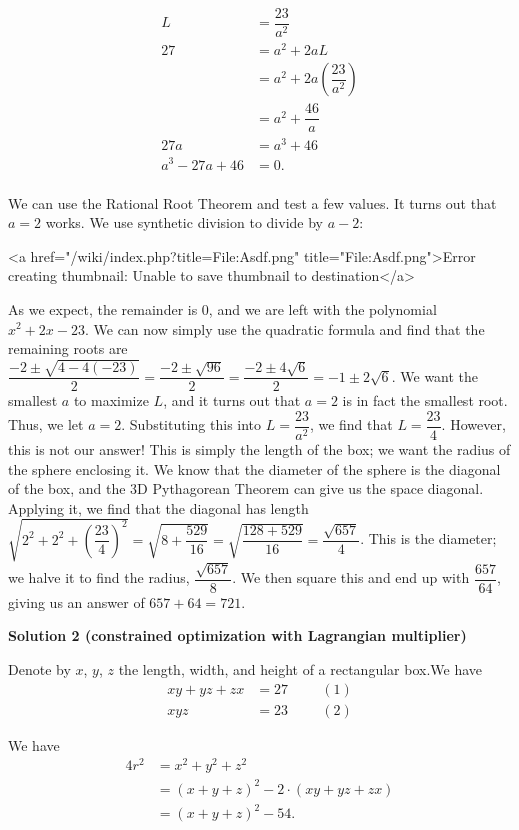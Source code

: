 \begin{enumerate}
 \begin{align*}L&=\dfrac{23}{a^2} \\27&=a^2+2aL \\&=a^2+2a\left(\dfrac{23}{a^2}\right) \\&=a^2+\dfrac{46}a \\27a&=a^3+46 \\a^3-27a+46&=0. \\\end{align*}


 We can use the Rational Root Theorem and test a few values. It turns out that $a=2$ works. We use synthetic division to divide by $a-2$: 

 <a href="/wiki/index.php?title=File:Asdf.png" title="File:Asdf.png">Error creating thumbnail: Unable to save thumbnail to destination</a>

 As we expect, the remainder is $0$, and we are left with the polynomial $x^2+2x-23$. We can now simply use the quadratic formula and find that the remaining roots are $\dfrac{-2\pm\sqrt{4-4(-23)}}2=\dfrac{-2\pm\sqrt{96}}2=\dfrac{-2\pm4\sqrt{6}}2=-1\pm2\sqrt6$. We want the smallest $a$ to maximize $L$, and it turns out that $a=2$ is in fact the smallest root. Thus, we let $a=2$. Substituting this into $L=\dfrac{23}{a^2}$, we find that $L=\dfrac{23}4$. However, this is not our answer! This is simply the length of the box; we want the radius of the sphere enclosing it. We know that the diameter of the sphere is the diagonal of the box, and the 3D Pythagorean Theorem can give us the space diagonal. Applying it, we find that the diagonal has length $\sqrt{2^2+2^2+\left(\dfrac{23}4\right)^2}=\sqrt{8+\dfrac{529}{16}}=\sqrt{\dfrac{128+529}{16}}=\dfrac{\sqrt{657}}4$. This is the diameter; we halve it to find the radius, $\dfrac{\sqrt{657}}8$. We then square this and end up with $\dfrac{657}{64}$, giving us an answer of $657+64=\boxed{721}$. 

 



\textbf{Solution 2 (constrained optimization with Lagrangian multiplier)}

Denote by $x$, $y$, $z$ the length, width, and height of a rectangular box.We have\begin{align*}xy + yz + zx & = 27  \hspace{1cm} (1) \\xyz & = 23 \hspace{1cm} (2)\end{align*}


 We have\begin{align*}4 r^2 & = x^2 + y^2 + z^2 \\& = \left( x + y + z \right)^2 - 2 \cdot \left( xy + yz + zx \right) \\& = \left( x + y + z \right)^2 - 54 .\end{align*}



\end{enumerate}
